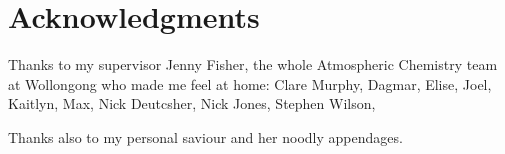 \chapter*{Acknowledgments}

  Thanks to my supervisor Jenny Fisher, the whole Atmospheric Chemistry team at Wollongong who made me feel at home: Clare Murphy, Dagmar, Elise, Joel, Kaitlyn, Max, Nick Deutcsher, Nick Jones, Stephen Wilson, 

  Thanks also to my personal saviour and her noodly appendages.
